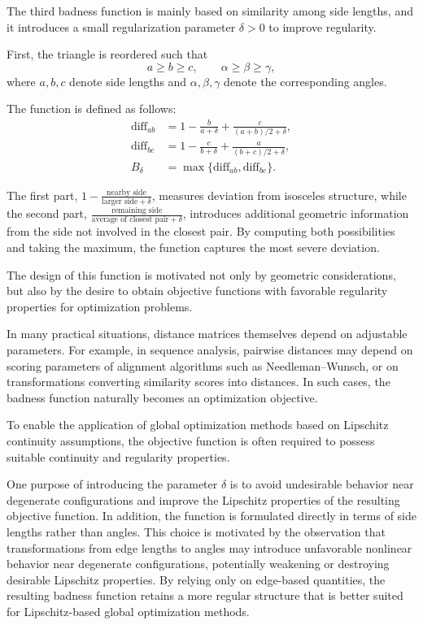 \documentclass[11pt]{article}
\begin{document}
The third badness function is mainly based on similarity among side lengths, and it introduces a small regularization parameter $\delta>0$ to improve regularity.

First, the triangle is reordered such that
\[
a \ge b \ge c, \qquad \alpha \ge \beta \ge \gamma,
\]
where $a,b,c$ denote side lengths and $\alpha,\beta,\gamma$ denote the corresponding angles.

The function is defined as follows:
\[
\begin{aligned}
\text{diff}_{ab} &= 1 - \frac{b}{a + \delta} + \frac{c}{(a+b)/2 + \delta}, \\
\text{diff}_{bc} &= 1 - \frac{c}{b + \delta} + \frac{a}{(b+c)/2 + \delta}, \\
B_\delta &= \max\{\text{diff}_{ab}, \text{diff}_{bc}\}.
\end{aligned}
\]

The first part, $1 - \frac{\text{nearby side}}{\text{larger side} + \delta}$, measures deviation from isosceles structure, while the second part, $\frac{\text{remaining side}}{\text{average of closest pair} + \delta}$, introduces additional geometric information from the side not involved in the closest pair. By computing both possibilities and taking the maximum, the function captures the most severe deviation.

The design of this function is motivated not only by geometric considerations, but also by the desire to obtain objective functions with favorable regularity properties for optimization problems.

In many practical situations, distance matrices themselves depend on adjustable parameters. For example, in sequence analysis, pairwise distances may depend on scoring parameters of alignment algorithms such as Needleman--Wunsch, or on transformations converting similarity scores into distances. In such cases, the badness function naturally becomes an optimization objective.

To enable the application of global optimization methods based on Lipschitz continuity assumptions, the objective function is often required to possess suitable continuity and regularity properties.

One purpose of introducing the parameter \(\delta\) is to avoid undesirable behavior near degenerate configurations and improve the Lipschitz properties of the resulting objective function. In addition, the function is formulated directly in terms of side lengths rather than angles. This choice is motivated by the observation that transformations from edge lengths to angles may introduce unfavorable nonlinear behavior near degenerate configurations, potentially weakening or destroying desirable Lipschitz properties. By relying only on edge-based quantities, the resulting badness function retains a more regular structure that is better suited for Lipschitz-based global optimization methods.
\end{document}
